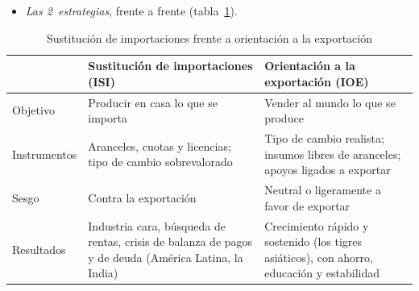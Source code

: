 \documentclass[11pt]{article}
\begin{document}
\begin{itemize}
\item \emph{Las 2~estrategias}, frente a frente (tabla~\ref{tab:isi-ioe}).
\end{itemize}
\begin{table}[H]
\centering
\caption{Sustitución de importaciones frente a orientación a la exportación}\label{tab:isi-ioe}
\small
\begin{tabular}{>{\centering\arraybackslash}m{2.6cm}>{\centering\arraybackslash}m{5.6cm}>{\centering\arraybackslash}m{5.6cm}}
\toprule
\rowcolor{tceeazulpalido} & \textbf{Sustitución de importaciones (ISI)} & \textbf{Orientación a la exportación (IOE)}\\
\midrule
\cellcolor{tceesalvia}Objetivo & Producir en casa lo que se importa & Vender al mundo lo que se produce\\
\addlinespace[0.3em]
\cellcolor{tceesalvia}Instrumentos & Aranceles, cuotas y licencias; tipo de cambio sobrevalorado & Tipo de cambio realista; insumos libres de aranceles; apoyos ligados a exportar\\
\addlinespace[0.3em]
\cellcolor{tceesalvia}Sesgo & \textcolor{tceerojo}{Contra la exportación} & \textcolor{tceeverde}{Neutral o ligeramente a favor de exportar}\\
\addlinespace[0.3em]
\cellcolor{tceesalvia}Resultados & Industria cara, búsqueda de rentas, crisis de balanza de pagos y de deuda (América Latina, la India) & Crecimiento rápido y sostenido (los tigres asiáticos), con ahorro, educación y estabilidad\\
\bottomrule
\end{tabular}
\end{table}
\end{document}
